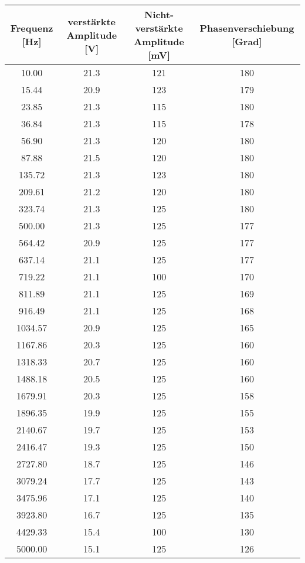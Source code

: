 \begin{tabular}{cccc}
    \toprule
    Frequenz [Hz] & verstärkte Amplitude [V] & Nicht-verstärkte Amplitude [mV] & Phasenverschiebung [Grad]\\
    \midrule
    10.00  &  21.3  &  121 &  180 \\
    15.44 & 20.9 & 123 & 179 \\
    23.85 & 21.3 & 115 & 180 \\
    36.84 & 21.3 & 115 & 178 \\
    56.90 & 21.3 & 120 & 180 \\
    87.88 & 21.5 & 120 & 180 \\
    135.72 & 21.3 & 123 & 180 \\
    209.61 & 21.2 & 120 & 180 \\
    323.74 & 21.3 & 125 & 180 \\
    500.00 & 21.3 & 125 & 177 \\
    564.42 & 20.9 & 125 & 177 \\
    637.14 & 21.1 & 125 & 177 \\
    719.22 & 21.1 & 100 & 170 \\
    811.89 & 21.1 & 125 & 169 \\
    916.49 & 21.1 & 125 & 168 \\
    1034.57 & 20.9 & 125 & 165 \\
    1167.86 & 20.3 & 125 & 160 \\
    1318.33 & 20.7 & 125 & 160 \\
    1488.18 & 20.5 & 125 & 160 \\
    1679.91 & 20.3 & 125 & 158 \\
    1896.35 & 19.9 & 125 & 155 \\
    2140.67 & 19.7 & 125 & 153 \\
    2416.47 & 19.3 & 125 & 150 \\
    2727.80 & 18.7 & 125 & 146 \\
    3079.24 & 17.7 & 125 & 143 \\
    3475.96 & 17.1 & 125 & 140 \\
    3923.80 & 16.7 & 125 & 135 \\
    4429.33 & 15.4 & 100 & 130 \\
    5000.00 & 15.1 & 125 & 126 \\
    \bottomrule
\end{tabular}

